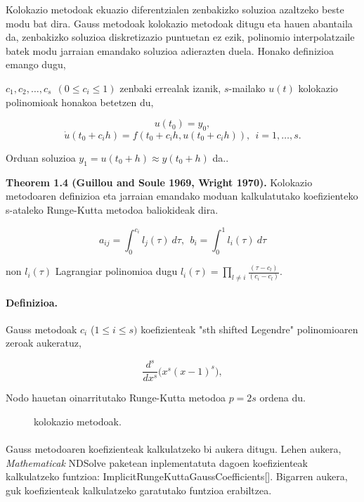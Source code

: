 Kolokazio metodoak ekuazio diferentzialen zenbakizko soluzioa azaltzeko beste modu bat dira. Gauss metodoak kolokazio metodoak ditugu eta hauen abantaila da, zenbakizko soluzioa diskretizazio puntuetan ez ezik, polinomio interpolatzaile batek modu jarraian emandako soluzioa adierazten duela. Honako definizioa emango dugu,

\begin{definizioa}
$c_1,c_2,\dots,c_s \ \ (0\leq c_i \leq 1)$ zenbaki errealak izanik, $s$-mailako $u(t)$   kolokazio polinomioak honakoa betetzen du,

\[u(t_0)=y_0 ,\]
\[\dot{u}(t_0+c_ih)=f(t_0+c_i h, u(t_0+c_i h)), \ \ i=1,\dots,s.\] 


Orduan soluzioa $y_1=u(t_0+h)\approx y(t_0+h)$ da..
\end{definizioa}

\begin{teorema}
\textbf{Theorem 1.4 (Guillou and Soule 1969, Wright 1970).}
Kolokazio metodoaren definizioa eta jarraian emandako moduan kalkulatutako koefizienteko s-ataleko Runge-Kutta metodoa baliokideak dira.

\begin{equation}
a_{ij}=\int_{0}^{c_i} l_j(\tau) \ d\tau, \ \ b_i=\int_{0}^{1} l_i(\tau) \ d\tau
\end{equation}

non $l_i(\tau)$ Lagrangiar polinomioa dugu $l_i(\tau)=\prod_{l\neq i} \frac{(\tau-c_l)}{(c_i-c_l)}$.
\end{teorema}

\paragraph{\textbf{Definizioa}.} Gauss metodoak $c_i$ ($1 \leq i \leq s)$ koefizienteak "sth shifted Legendre" polinomioaren zeroak aukeratuz,

\begin{equation*}
\frac{d^s}{dx^s} \big(x^s(x-1)^s \big),
\end{equation*} 

Nodo hauetan oinarritutako Runge-Kutta metodoa $p=2s$ ordena du.

\begin{figure}[h]
\centering
{}
\caption{ \small kolokazio metodoak.}
\label{fig:kolokazio metodoak}
\end{figure}


\paragraph*{} Gauss metodoaren koefizienteak kalkulatzeko bi aukera ditugu. Lehen aukera,  \emph{Mathematicak} NDSolve paketean inplementatuta dagoen koefizienteak kalkulatzeko funtzioa: ImplicitRungeKuttaGaussCoefficients[]. Bigarren aukera, guk koefizienteak kalkulatzeko garatutako funtzioa erabiltzea.  


